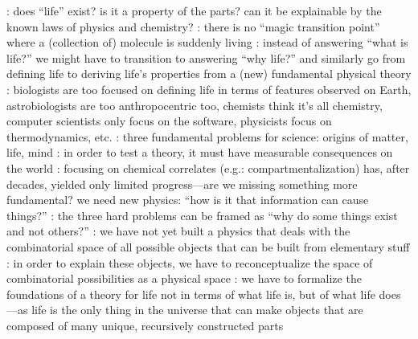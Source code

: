 \markdownRendererDocumentBegin
{}\markdownRendererInterblockSeparator
{}\markdownRendererUlBeginTight
{}: does “life” exist? is it a property of the parts? can it be explainable by the known laws of physics and chemistry?\markdownRendererUlItemEnd 
{}: there is no “magic transition point” where a (collection of) molecule is suddenly living\markdownRendererUlItemEnd 
{}: instead of answering “what is life?” we might have to transition to answering “why life?” and similarly go from defining life to deriving life’s properties from a (new) fundamental physical theory\markdownRendererUlItemEnd 
{}: biologists are too focused on defining life in terms of features observed on Earth, astrobiologists are too anthropocentric too, chemists think it’s all chemistry, computer scientists only focus on the software, physicists focus on thermodynamics, etc.\markdownRendererUlItemEnd 
\markdownRendererUlEndTight \markdownRendererInterblockSeparator
{}\markdownRendererInterblockSeparator
{}\markdownRendererUlBeginTight
{}: three fundamental problems for science: origins of matter, life, mind\markdownRendererUlItemEnd 
{}: in order to test a theory, it must have measurable consequences on the world\markdownRendererUlItemEnd 
{}: focusing on chemical correlates (e.g.: compartmentalization) has, after decades, yielded only limited progress—are we missing something more fundamental? we need new physics: “how is it that information can cause things?”\markdownRendererUlItemEnd 
{}: the three hard problems can be framed as “why do some things exist and not others?”\markdownRendererUlItemEnd 
\markdownRendererUlEndTight \markdownRendererInterblockSeparator
{}\markdownRendererInterblockSeparator
{}\markdownRendererUlBeginTight
{}: we have not yet built a physics that deals with the combinatorial space of all possible objects that can be built from elementary stuff\markdownRendererUlItemEnd 
{}: in order to explain these objects, we have to reconceptualize the space of combinatorial possibilities as a physical space\markdownRendererUlItemEnd 
{}: we have to formalize the foundations of a theory for life not in terms of what life is, but of what life does—as life is the only thing in the universe that can make objects that are composed of many unique, recursively constructed parts\markdownRendererUlItemEnd 

